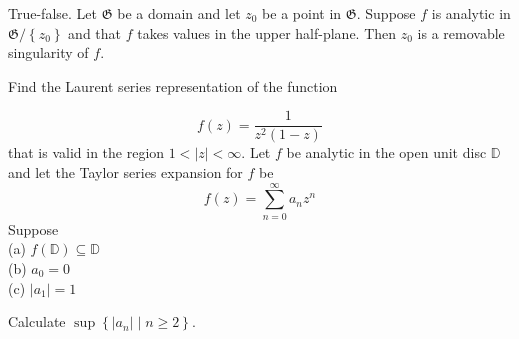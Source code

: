 \documentclass[14pt]{extarticle}
\begin{document}
True-false. Let $\mathfrak{G}$ be a domain and let $z_{0}$ be a point in $\mathfrak{G}$. Suppose $f$ is analytic in $\mathfrak{G} /\left\{z_{0}\right\}$ and that $f$ takes values in the upper half-plane. Then $z_{0}$ is a removable singularity of $f$.
\newpage

Find the Laurent series representation of the function

$$
f(z)=\frac{1}{z^{2}(1-z)}
$$
that is valid in the region $1<|z|<\infty$.
\newpage
Let $f$ be analytic in the open unit disc $\mathbb{D}$ and let the Taylor series expansion for $f$ be
$$
f(z)=\sum_{n=0}^{\infty} a_{n} z^{n}
$$
Suppose\\
(a) $f(\mathbb{D}) \subseteq \mathbb{D}$\\
(b) $a_{0}=0$\\
(c) $\left|a_{1}\right|=1$

Calculate $\sup \left\{\left|a_{n}\right| \mid n \geq 2\right\}$.
\newpage
\end{document}
